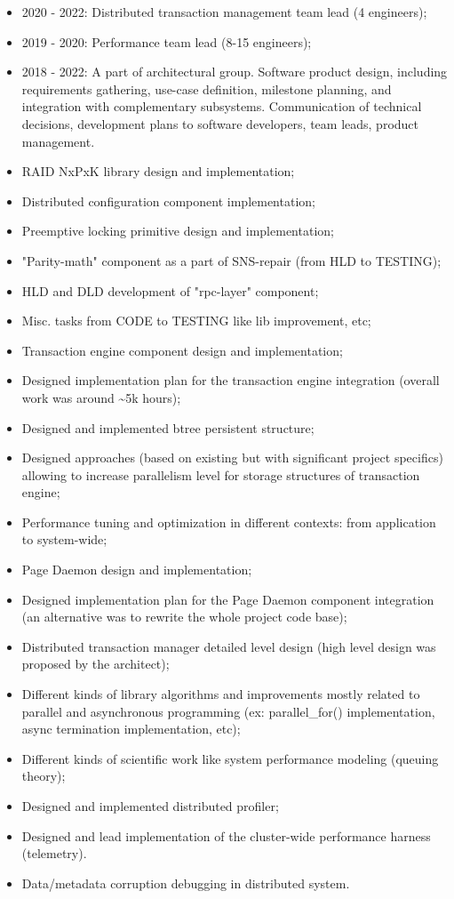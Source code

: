 \documentclass[8pt,a4paper]{article}
\begin{document}
\begin{itemize}
\item 2020 - 2022: Distributed transaction management team lead (4 engineers);
\item 2019 - 2020: Performance team lead (8-15 engineers);
\item 2018 - 2022: A part of architectural group. Software product
design, including requirements gathering, use-case definition,
milestone planning, and integration with complementary
subsystems. Communication of technical decisions, development plans
to software developers, team leads, product management.
\item RAID NxPxK library design and implementation;
\item Distributed configuration component implementation;
\item Preemptive locking primitive design and implementation;
\item "Parity-math" component as a part of SNS-repair (from HLD to TESTING);
\item HLD and DLD development of "rpc-layer" component;
\item Misc. tasks from CODE to TESTING like lib improvement, etc;
\item Transaction engine component design and implementation;
\item Designed implementation plan for the transaction engine integration
(overall work was around \textasciitilde{}5k hours);
\item Designed and implemented btree persistent structure;
\item Designed approaches (based on existing but with significant project
specifics) allowing to increase parallelism level for storage
structures of transaction engine;
\item Performance tuning and optimization in different contexts: from
application to system-wide;
\item Page Daemon design and implementation;
\item Designed implementation plan for the Page Daemon component
integration (an alternative was to rewrite the whole project code
base);
\item Distributed transaction manager detailed level design (high level
design was proposed by the architect);
\item Different kinds of library algorithms and improvements mostly
related to parallel and asynchronous programming (ex:
parallel\_for() implementation, async termination implementation,
etc);
\item Different kinds of scientific work like system performance modeling
(queuing theory);
\item Designed and implemented distributed profiler;
\item Designed and lead implementation of the cluster-wide performance
harness (telemetry).
\item Data/metadata corruption debugging in distributed system.
\end{itemize}
\end{document}
